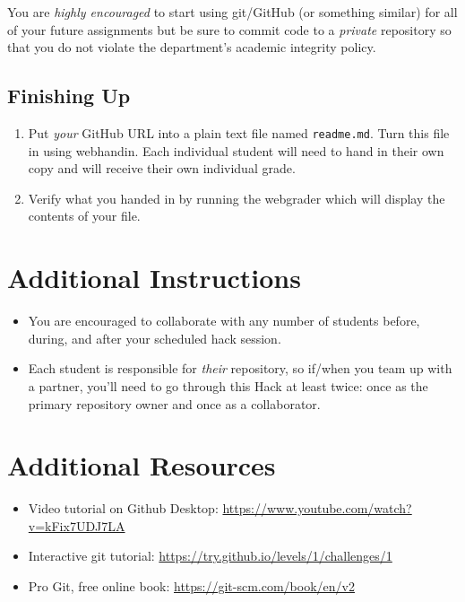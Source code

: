 \documentclass[12pt]{scrartcl}
\begin{document}
You are \emph{highly encouraged} to start using git/GitHub (or 
something similar) for all of your future assignments 
but be sure to commit code to a \emph{private} repository 
so that you do not violate the department's academic integrity 
policy.  

\subsection{Finishing Up}

\begin{enumerate}
  \item Put \emph{your} GitHub URL into a plain text file named 
  \texttt{readme.md}.  Turn this file
  in using webhandin.  Each individual student will need
  to hand in their own copy and will receive their own individual
  grade.
  \item Verify what you handed in by running the webgrader which will
  display the contents of your file.
\end{enumerate}


\section*{Additional Instructions}

\begin{itemize}
  \item You are encouraged to collaborate with any number of students 
  before, during, and after your scheduled hack session.    
  \item Each student is responsible for \emph{their} repository, so 
  if/when you team up with a partner, you'll need to go through this
  Hack at least twice: once as the primary repository owner and once as
  a collaborator.
\end{itemize}
  
\section*{Additional Resources}

\begin{itemize} 
  \item Video tutorial on Github Desktop: \url{https://www.youtube.com/watch?v=kFix7UDJ7LA}
  \item Interactive git tutorial: \url{https://try.github.io/levels/1/challenges/1}
  \item Pro Git, free online book: \url{https://git-scm.com/book/en/v2}
\end{itemize}


  
\end{document}
